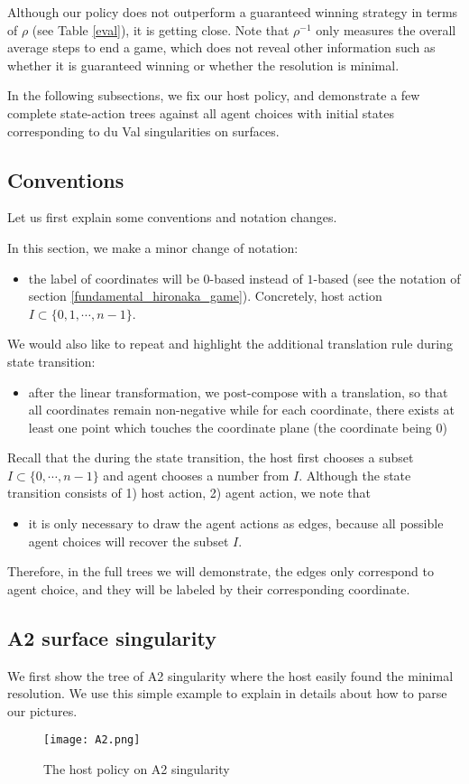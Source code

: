 \documentclass{article}
\theoremstyle{plain}
\theoremstyle{definition}
\theoremstyle{remark}
\begin{document}
Although our policy does not outperform a guaranteed winning strategy in terms of $\rho$ (see Table \ref{eval}), it is getting close. Note that $\rho^{-1}$ only measures the overall average steps to end a game, which does not reveal other information such as whether it is guaranteed winning or whether the resolution is minimal. 

In the following subsections, we fix our host policy, and demonstrate a few complete state-action trees against all agent choices with initial states corresponding to du Val singularities on surfaces. 

\subsection{Conventions}
Let us first explain some conventions and notation changes.

In this section, we make a minor change of notation: 
\begin{itemize}
    \item the label of coordinates will be $0$-based instead of $1$-based (see the notation of section \ref{fundamental_hironaka_game}). Concretely, host action $I\subset \{0, 1, \cdots, n-1\}$.
\end{itemize}

We would also like to repeat and highlight the additional translation rule during state transition:
\begin{itemize}
    \item after the linear transformation, we post-compose with a translation, so that all coordinates remain non-negative while for each coordinate, there exists at least one point which touches the coordinate plane (the coordinate being $0$)
\end{itemize}

Recall that the during the state transition, the host first chooses a subset $I\subset\{0, \cdots, n-1\}$ and agent chooses a number from $I$. Although the state transition consists of 1) host action, 2) agent action, we note that 
\begin{itemize}
    \item it is only necessary to draw the agent actions as edges, because all possible agent choices will recover the subset $I$.
\end{itemize}
Therefore, in the full trees we will demonstrate, the edges only correspond to agent choice, and they will be labeled by their corresponding coordinate.


\subsection{A2 surface singularity}
We first show the tree of A2 singularity where the host easily found the minimal resolution. We use this simple example to explain in details about how to parse our pictures.
\begin{figure}[ht!]
\centering
\texttt{[image: A2.png]}
\caption{The host policy on A2 singularity} 
\end{figure}
\end{document}
